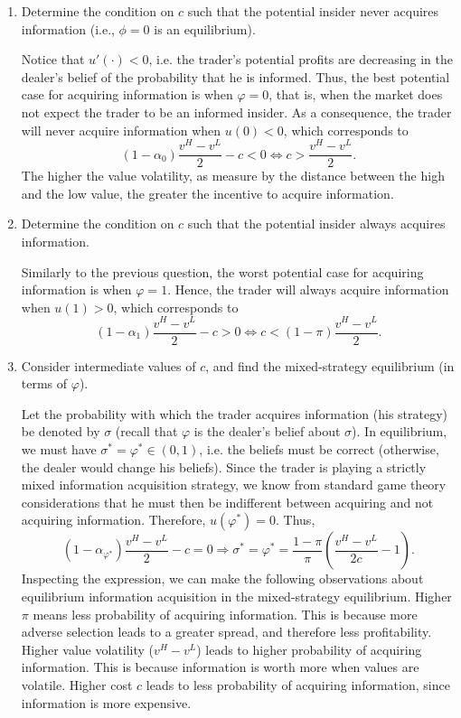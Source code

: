 \documentclass[11pt
, answers
]{exam}
\begin{document}
\begin{enumerate} [label=(\alph*). ]
\item Determine the condition on $c$ such that the potential insider never acquires information (i.e., $\phi=0$ is an equilibrium).

\begin{solution}
Notice that $u'(\cdot)<0$, i.e. the trader's potential profits are decreasing in the dealer's belief of the probability that he is informed. Thus, the best potential case for acquiring information is when $\varphi=0$, that is, when the market does not expect the trader to be an informed insider. As a consequence, the trader will never acquire information when $u(0) < 0$, which corresponds to
\[
(1-\alpha_0)\frac{v^H-v^L}{2}-c <0 \Leftrightarrow c > \frac{v^H-v^L}{2}.
\]
The higher the value volatility, as measure by the distance between the high and the low value, the greater the incentive to acquire information.
\end{solution}

\item Determine the condition on $c$ such that the potential insider always acquires information.

\begin{solution}
Similarly to the previous question, the worst potential case for acquiring information is when $\varphi=1$. Hence, the trader will always acquire information when $u(1) > 0$, which corresponds to
\[
(1-\alpha_1)\frac{v^H-v^L}{2}-c > 0 \Leftrightarrow c < (1-\pi) \frac{v^H-v^L}{2}.
\]

\end{solution}

\item Consider intermediate values of $c$, and find the mixed-strategy equilibrium (in terms of $\varphi$).

\begin{solution}
Let the probability with which the trader acquires information (his strategy) be denoted by $\sigma$ (recall that $\varphi$ is the dealer's belief about $\sigma$). In equilibrium, we must have $\sigma^*=\varphi^* \in (0,1)$, i.e. the beliefs must be correct (otherwise, the dealer would change his beliefs). Since the trader is playing a strictly mixed information acquisition strategy, we know from standard game theory considerations that he must then be indifferent between acquiring and not acquiring information. Therefore, $u(\varphi^*)=0$. Thus,
\[
(1-\alpha_{\varphi^*})\frac{v^H-v^L}{2}-c = 0 \Rightarrow \sigma^*=\varphi^* = \frac{1-\pi}{\pi} \left(\frac{v^H-v^L}{2c} -1 \right).
\]
Inspecting the expression, we can make the following observations about equilibrium information acquisition in the mixed-strategy equilibrium. Higher $\pi$ means less probability of acquiring information. This is because more adverse selection leads to a greater spread, and therefore less profitability. Higher value volatility ($v^H-v^L$) leads to higher probability of acquiring information. This is because information is worth more when values are volatile. Higher cost $c$ leads to less probability of acquiring information, since information is more expensive.


\end{solution}
\end{enumerate}
\end{document}

